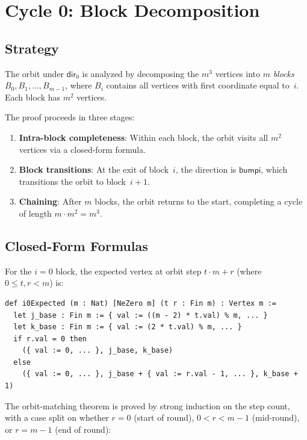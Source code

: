\documentclass[11pt,a4paper]{article}
\begin{document}
\section{Cycle 0: Block Decomposition}
\label{sec:cycle0}

\subsection{Strategy}

The orbit under $\mathsf{dir}_0$ is analyzed by decomposing the $m^3$ vertices into
$m$ \emph{blocks} $B_0, B_1, \ldots, B_{m-1}$, where $B_i$ contains all vertices
with first coordinate equal to~$i$.  Each block has $m^2$ vertices.

The proof proceeds in three stages:
\begin{enumerate}
  \item \textbf{Intra-block completeness}: Within each block, the orbit visits
    all $m^2$ vertices via a closed-form formula.
  \item \textbf{Block transitions}: At the exit of block~$i$, the direction is
    $\mathsf{bumpi}$, which transitions the orbit to block~$i{+}1$.
  \item \textbf{Chaining}: After $m$ blocks, the orbit returns to the start,
    completing a cycle of length $m \cdot m^2 = m^3$.
\end{enumerate}

\subsection{Closed-Form Formulas}

For the $i = 0$ block, the expected vertex at orbit step $t \cdot m + r$
(where $0 \le t, r < m$) is:

\begin{lstlisting}[caption={Expected formula for the $i=0$ block}]
def i0Expected (m : Nat) [NeZero m] (t r : Fin m) : Vertex m :=
  let j_base : Fin m := { val := ((m - 2) * t.val) % m, ... }
  let k_base : Fin m := { val := (2 * t.val) % m, ... }
  if r.val = 0 then
    ({ val := 0, ... }, j_base, k_base)
  else
    ({ val := 0, ... }, j_base + { val := r.val - 1, ... }, k_base + 1)
\end{lstlisting}

The orbit-matching theorem is proved by strong induction on the step count,
with a case split on whether $r = 0$ (start of round), $0 < r < m-1$ (mid-round),
or $r = m-1$ (end of round):
\end{document}
